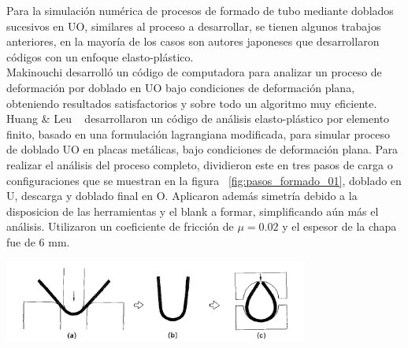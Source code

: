 Para la simulación numérica de procesos de formado de tubo mediante doblados sucesivos en UO, 
similares al proceso a desarrollar, se tienen algunos trabajos anteriores, en la mayoría de los 
casos son autores japoneses que desarrollaron códigos con un enfoque elasto-plástico.\\

Makinouchi \cite{makinouchi1989} desarrolló un código de computadora para analizar un proceso 
de deformación por doblado en UO bajo condiciones de deformación plana, obteniendo resultados 
satisfactorios y sobre todo un algoritmo muy eficiente.\\

Huang & Leu ~\cite{huang1995} desarrollaron un código de análisis elasto-plástico por elemento finito, 
basado en una formulación lagrangiana modificada, para simular proceso de doblado UO en placas metálicas, 
bajo condiciones de deformación plana. Para realizar el análisis del proceso completo, dividieron este 
en tres pasos de carga o configuraciones que se muestran en la figura ~\ref{fig:pasos_formado_01}, 
doblado en U, descarga y doblado final en O. Aplicaron además simetría debido a la disposicion de las 
herramientas y el blank a formar, simplificando aún más el análisis. Utilizaron un coeficiente 
de fricción de $\mu = 0.02$ y el espesor de la chapa fue de 6 mm. \\

\begin{center}
\includegraphics[width=0.75\textwidth]{src/ch1/uo-bending.png}
 \label{fig:pasos_formado_01}
\end{center}


